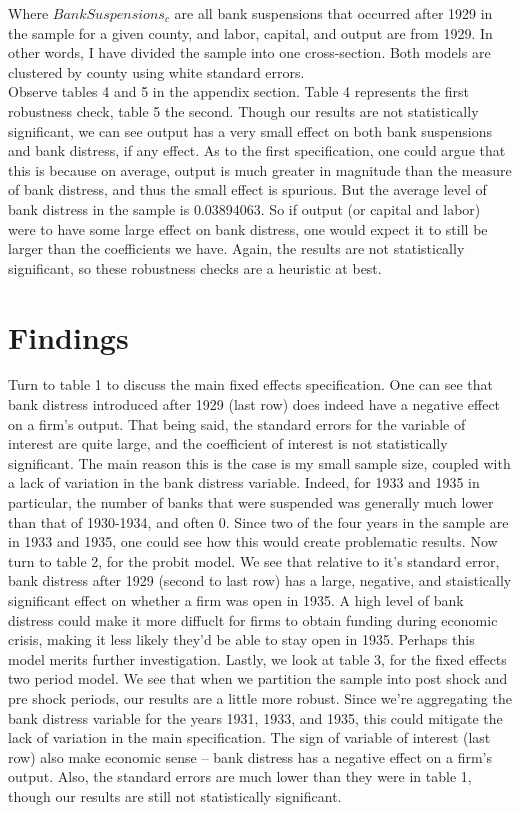 \documentclass[letter,11pt]{article}
\begin{document}
{Where $BankSuspensions_c$ are all bank suspensions that occurred after 1929 in the sample for a given county, and labor, capital, and output are from 1929. In other words, I have divided the sample into one cross-section. Both models are clustered by county using white standard errors.
\\
\indent Observe tables 4 and 5 in the appendix section. Table 4 represents the first robustness check, table 5 the second. Though our results are not statistically significant, we can see output has a very small effect on both bank suspensions and bank distress, if any effect. As to the first specification, one could argue that this is because on average, output is much greater in magnitude than the measure of bank distress, and thus the small effect is spurious. But the average level of bank distress in the sample is 0.03894063. So if output (or capital and labor) were to have some large effect on bank distress, one would expect it to still be larger than the coefficients we have. Again, the results are not statistically significant, so these robustness checks are a heuristic at best.

\section{Findings}
\indent Turn to table 1 to discuss the main fixed effects specification. One can see that bank distress introduced after 1929 (last row) does indeed have a negative effect on a firm's output. That being said, the standard errors for the variable of interest are quite large, and the coefficient of interest is not statistically significant. The main reason this is the case is my small sample size, coupled with a lack of variation in the bank distress variable. Indeed, for 1933 and 1935 in particular, the number of banks that were suspended was generally much lower than that of 1930-1934, and often 0. Since two of the four years in the sample are in 1933 and 1935, one could see how this would create problematic results.
\indent Now turn to table 2, for the probit model. We see that relative to it's standard error, bank distress after 1929 (second to last row) has a large, negative, and staistically significant effect on whether a firm was open in 1935. A high level of bank distress could make it more diffuclt for firms to obtain funding during economic crisis, making it less likely they'd be able to stay open in 1935. Perhaps this model merits further investigation.
\indent Lastly, we look at table 3, for the fixed effects two period model. We see that when we partition the sample into post shock and pre shock periods, our results are a little more robust. Since we're aggregating the bank distress variable for the years 1931, 1933, and 1935, this could mitigate the lack of variation in the main specification. The sign of variable of interest (last row) also make economic sense -- bank distress has a negative effect on a firm's output. Also, the standard errors are much lower than they were in table 1, though our results are still not statistically significant. 

}
\end{document}
